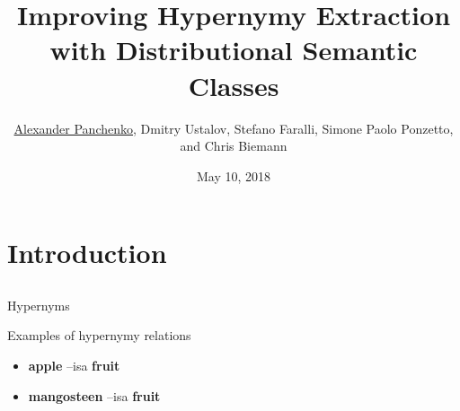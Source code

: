 \documentclass[usenames,dvipsnames]{beamer}
\title{Improving Hypernymy Extraction with Distributional Semantic Classes}
\author[Panchenko et al. LREC'18]{\underline{Alexander Panchenko}, Dmitry Ustalov, Stefano Faralli, Simone Paolo Ponzetto, and Chris Biemann}
\date[10.05.2018]{May 10, 2018}
\begin{document}
\maketitle

%
\section{Introduction}
\subsection{}


\begin{frame}{Hypernyms}

\begin{block}{Examples of hypernymy relations}
\begin{itemize}
	\item \textbf{apple} --isa\textrightarrow \textbf{ fruit}
	\item \textbf{mangosteen} --isa\textrightarrow \textbf{ fruit}
\end{itemize}
\end{block}

\vspace{92pt}

$ $ 
\end{frame}
\end{document}
